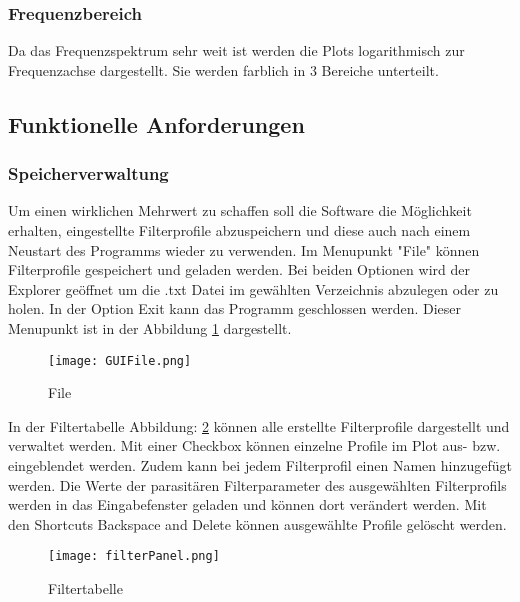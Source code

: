 \subsubsection{Frequenzbereich}\label{subsubsec:frequenzbereich}
Da das Frequenzspektrum sehr weit ist werden die Plots logarithmisch zur Frequenzachse dargestellt. Sie werden farblich in 3 Bereiche unterteilt.
\bigskip
		
\subsection{Funktionelle Anforderungen} \label{subsec:funktionelleanforderungen}

\bigskip
\subsubsection{Speicherverwaltung}  \label{subsubsec:speicherverwaltung}
Um einen wirklichen Mehrwert zu schaffen soll die Software die Möglichkeit erhalten, eingestellte Filterprofile abzuspeichern und diese auch nach einem Neustart des Programms wieder zu verwenden. Im Menupunkt "File" können Filterprofile gespeichert und geladen werden. Bei beiden Optionen wird der Explorer geöffnet um die .txt Datei im gewählten Verzeichnis abzulegen oder zu holen. In der Option Exit kann das Programm geschlossen werden. Dieser Menupunkt ist in der Abbildung \ref{fig:GUIFile}  dargestellt.
\begin{figure}[H]
	\centering
	\texttt{[image: GUIFile.png]}
	\caption{File}
	\label{fig:GUIFile}
\end{figure}
In der Filtertabelle Abbildung: \ref{fig:filterPanel} können alle erstellte Filterprofile dargestellt und verwaltet werden.  Mit einer Checkbox können einzelne Profile im Plot aus- bzw. eingeblendet werden. Zudem kann bei jedem Filterprofil einen Namen hinzugefügt werden. Die Werte der parasitären Filterparameter des ausgewählten Filterprofils werden in das Eingabefenster geladen und können dort verändert werden. Mit den Shortcuts Backspace and Delete können ausgewählte Profile gelöscht werden.
\begin{figure}[H]
	\centering
	\texttt{[image: filterPanel.png]}
	\caption{Filtertabelle}
	\label{fig:filterPanel}
\end{figure}
\bigskip

